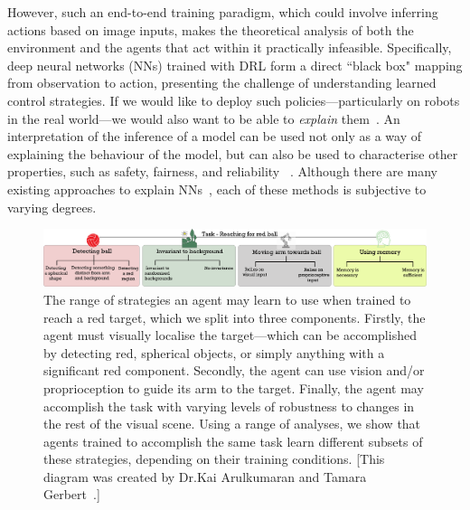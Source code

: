 However, such an end-to-end training paradigm, which could involve inferring actions based on image inputs, makes the theoretical analysis of both the environment and the agents that act within it practically infeasible. Specifically, deep neural networks (NNs) trained with DRL form a direct ``black box" mapping from observation to action, presenting the challenge of understanding learned control strategies. If we would like to deploy such policies---particularly on robots in the real world---we would also want to be able to \emph{explain} them~\cite{arrieta2020explainable}. An interpretation of the inference of a model can be used not only as a way of explaining the behaviour of the model, but can also be used to characterise other properties, such as safety, fairness, and reliability ~\cite{doshi2017towards}. Although there are many existing approaches to explain NNs~\cite{guidotti2018survey}, each of these methods is subjective to varying degrees.
\begin{figure}[h!]
  \centering
  \includegraphics[width=\linewidth]{figures/chapter6/strategies.png}
  \caption[The range of strategies an agent may learn to use when trained to reach a red target.]{The range of strategies an agent may learn to use when trained to reach a red target, which we split into three components. Firstly, the agent must visually localise the target---which can be accomplished by detecting red, spherical objects, or simply anything with a significant red component. Secondly, the agent can use vision and/or proprioception to guide its arm to the target. Finally, the agent may accomplish the task with varying levels of robustness to changes in the rest of the visual scene. Using a range of analyses, we show that agents trained to accomplish the same task learn different subsets of these strategies, depending on their training conditions. [This diagram was created by Dr.Kai Arulkumaran and Tamara Gerbert~\cite{dai2022analysing}.]}
  \label{fig:strategies}
\end{figure}

